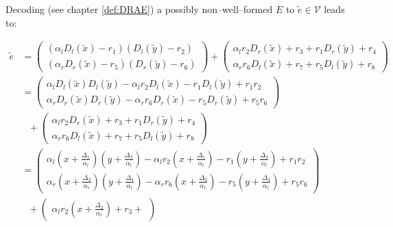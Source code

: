 Decoding (see chapter \ref{def:DRAE}) a possibly non--well--formed $E$ to
$\widetilde{e} \in \mathcal{V}$ leads to:

\begin{align*}
  \widetilde{e} & =
  \begin{pmatrix}
    (\alpha_l D_l(\widetilde{x})-r_1)
    (         D_l(\widetilde{y})-r_2) \\
    (\alpha_r D_r(\widetilde{x})-r_5)
    (         D_r(\widetilde{y})-r_6)
  \end{pmatrix}
  +
  \begin{pmatrix}
    \alpha_lr_2 D_r(\widetilde{x}) + r_3 +
    r_1         D_r(\widetilde{y}) + r_4 \\
    \alpha_rr_6 D_l(\widetilde{x}) + r_7 +
    r_5         D_l(\widetilde{y}) + r_8
  \end{pmatrix} \\
%
  & =
  \begin{pmatrix}
    \alpha_l     D_l(\widetilde{x}) D_l(\widetilde{y})
    -\alpha_lr_2 D_l(\widetilde{x})
    -r_1         D_l(\widetilde{y})
    +r_1r_2 \\
    \alpha_r     D_r(\widetilde{x}) D_r(\widetilde{y})
    -\alpha_rr_6 D_r(\widetilde{x})
    -r_5         D_r(\widetilde{y})
    +r_5r_6
  \end{pmatrix} \\
  &\ \ \ +
  \begin{pmatrix}
    \alpha_lr_2 D_r(\widetilde{x}) + r_3 +
    r_1         D_r(\widetilde{y}) + r_4 \\
    \alpha_rr_6 D_l(\widetilde{x}) + r_7 +
    r_5         D_l(\widetilde{y}) + r_8
  \end{pmatrix} \\
%
  & =
  \begin{pmatrix}
    \alpha_l     \left(x + \frac{\Delta_1}{\alpha_l}\right)
                 \left(y + \frac{\Delta_3}{\alpha_l}\right)
    -\alpha_lr_2 \left(x + \frac{\Delta_1}{\alpha_l}\right)
    -r_1         \left(y + \frac{\Delta_3}{\alpha_l}\right)
    +r_1r_2 \\
    \alpha_r     \left(x + \frac{\Delta_2}{\alpha_r}\right)
                 \left(y + \frac{\Delta_4}{\alpha_r}\right)
    -\alpha_rr_6 \left(x + \frac{\Delta_2}{\alpha_r}\right)
    -r_5         \left(y + \frac{\Delta_4}{\alpha_r}\right)
    + r_5r_6
  \end{pmatrix} \\
  &\ \ \ +
  \begin{pmatrix}
    \alpha_lr_2  \left(x + \frac{\Delta_2}{\alpha_r}\right) + r_3 +

\end{pmatrix}
\end{align*}
